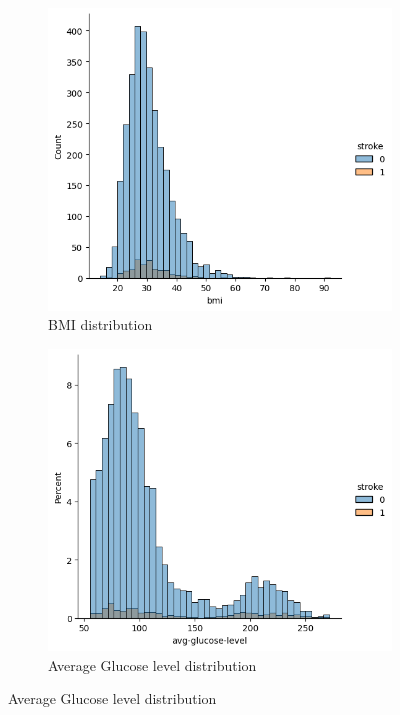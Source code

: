 \documentclass{Configuration_Files/Template}
\begin{document}
\begin{figure}[ht]
\centering
\begin{subfigure}[b]{\linewidth}
\centering
\includegraphics[scale=0.4]{Images/bmi_distribution.png}
\caption{BMI distribution}
\label{fig:bmi_distribution}
\end{subfigure}

\begin{subfigure}[b]{\linewidth}
\centering
\includegraphics[scale=0.4]{Images/glucose_distribution.png}
\caption{Average Glucose level distribution}
\label{fig:glucose}
\end{subfigure}


\end{figure}
\end{document}
